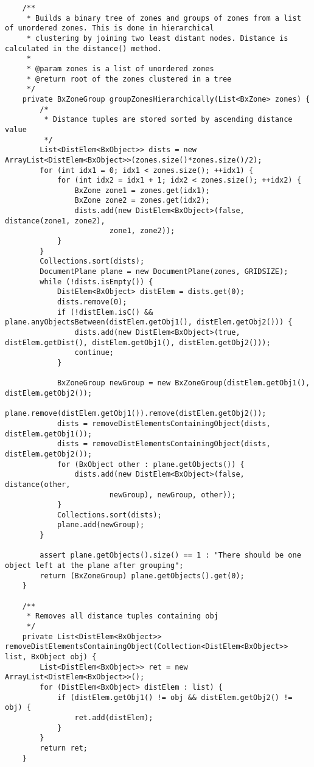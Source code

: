 \begin{appendices}
\begin{lstlisting}
    /**
     * Builds a binary tree of zones and groups of zones from a list of unordered zones. This is done in hierarchical
     * clustering by joining two least distant nodes. Distance is calculated in the distance() method.
     *
     * @param zones is a list of unordered zones
     * @return root of the zones clustered in a tree
     */
    private BxZoneGroup groupZonesHierarchically(List<BxZone> zones) {
        /*
         * Distance tuples are stored sorted by ascending distance value
         */
        List<DistElem<BxObject>> dists = new ArrayList<DistElem<BxObject>>(zones.size()*zones.size()/2);
        for (int idx1 = 0; idx1 < zones.size(); ++idx1) {
            for (int idx2 = idx1 + 1; idx2 < zones.size(); ++idx2) {
                BxZone zone1 = zones.get(idx1);
                BxZone zone2 = zones.get(idx2);
                dists.add(new DistElem<BxObject>(false, distance(zone1, zone2),
                        zone1, zone2));
            }
        }
        Collections.sort(dists);
        DocumentPlane plane = new DocumentPlane(zones, GRIDSIZE);
        while (!dists.isEmpty()) {
            DistElem<BxObject> distElem = dists.get(0);
            dists.remove(0);
            if (!distElem.isC() && plane.anyObjectsBetween(distElem.getObj1(), distElem.getObj2())) {
                dists.add(new DistElem<BxObject>(true, distElem.getDist(), distElem.getObj1(), distElem.getObj2()));
                continue;
            }

            BxZoneGroup newGroup = new BxZoneGroup(distElem.getObj1(), distElem.getObj2());
            plane.remove(distElem.getObj1()).remove(distElem.getObj2());
            dists = removeDistElementsContainingObject(dists, distElem.getObj1());
            dists = removeDistElementsContainingObject(dists, distElem.getObj2());
            for (BxObject other : plane.getObjects()) {
                dists.add(new DistElem<BxObject>(false, distance(other,
                        newGroup), newGroup, other));
            }
            Collections.sort(dists);
            plane.add(newGroup);
        }
        
        assert plane.getObjects().size() == 1 : "There should be one object left at the plane after grouping";
        return (BxZoneGroup) plane.getObjects().get(0);
    }

    /**
     * Removes all distance tuples containing obj
     */
    private List<DistElem<BxObject>> removeDistElementsContainingObject(Collection<DistElem<BxObject>> list, BxObject obj) {
        List<DistElem<BxObject>> ret = new ArrayList<DistElem<BxObject>>();
        for (DistElem<BxObject> distElem : list) {
            if (distElem.getObj1() != obj && distElem.getObj2() != obj) {
                ret.add(distElem);
            }
        }
        return ret;
    }


\end{lstlisting}
\end{appendices}
